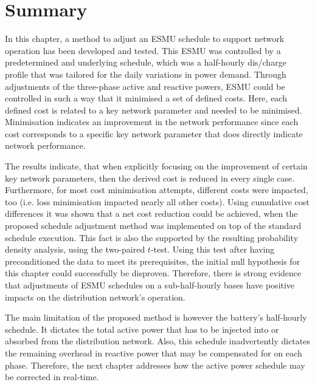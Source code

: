 \section{Summary}
\label{ch1:sec:summary}

In this chapter, a method to adjust an ESMU schedule to support network operation has been developed and tested.
This ESMU was controlled by a predetermined and underlying schedule, which was a half-hourly dis/charge profile that was tailored for the daily variations in power demand.
Through adjustments of the three-phase active and reactive powers, ESMU could be controlled in such a way that it minimised a set of defined costs.
Here, each defined cost is related to a key network parameter and needed to be minimised.
Minimisation indicates an improvement in the network performance since each cost corresponds to a specific key network parameter that does directly indicate network performance.

The results indicate, that when explicitly focusing on the improvement of certain key network parameters, then the derived cost is reduced in every single case.
Furthermore, for most cost minimisation attempts, different costs were impacted, too (i.e. loss minimisation impacted nearly all other costs).
Using cumulative cost differences it was shown that a net cost reduction could be achieved, when the proposed schedule adjustment method was implemented on top of the standard schedule execution.
This fact is also the supported by the resulting probability density analysis, using the two-paired $t$-test.
Using this test after having preconditioned the data to meet its prerequisites, the initial null hypothesis for this chapter could successfully be disproven.
Therefore, there is strong evidence that adjustments of ESMU schedules on a sub-half-hourly bases have positive impacts on the distribution network's operation.

The main limitation of the proposed method is however the battery's half-hourly schedule.
It dictates the total active power that has to be injected into or absorbed from the distribution network.
Also, this schedule inadvertently dictates the remaining overhead in reactive power that may be compensated for on each phase.
Therefore, the next chapter addresses how the active power schedule may be corrected in real-time.